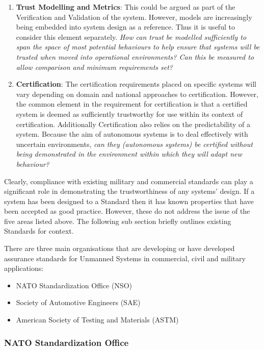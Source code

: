 \begin{enumerate}
  \item \textbf{Trust Modelling and Metrics}: This could be argued as part of the Verification and Validation of the system.
    However, models are increasingly being embedded into system design as a reference.
    Thus it is useful to consider this element separately.
    \textit{How can trust be modelled sufficiently to span the space of most potential behaviours to help ensure that systems will be trusted when moved into operational environments?
    Can this be measured to allow comparison and minimum requirements set?}
  \item \textbf{Certification}: The certification requirements placed on specific systems will vary depending on domain and national approaches to certification.
    However, the common element in the requirement for certification is that a certified system is deemed as sufficiently trustworthy for use within its context of certification.
    Additionally Certification also relies on the predictability of a system.
    Because the aim of autonomous systems is to deal effectively with uncertain environments, \textit{can they (autonomous systems) be certified without being demonstrated in the environment within which they will adapt new behaviour?}
\end{enumerate}

Clearly, compliance with existing military and commercial standards can play a significant role in demonstrating the trustworthiness of any systems’ design.
If a system has been designed to a Standard then it has known properties that have been accepted as good practice.
However, these do not address the issue of the five areas listed above.
The following sub section briefly outlines existing Standards for context.

There are three main organisations that are developing or have developed assurance standards for Unmanned Systems in commercial, civil and military applications:
\begin{itemize}
  \item NATO Standardization Office (NSO)
  \item Society of Automotive Engineers (SAE)
  \item American Society of Testing and Materials (ASTM)
\end{itemize}

\subsubsection{NATO Standardization Office}

